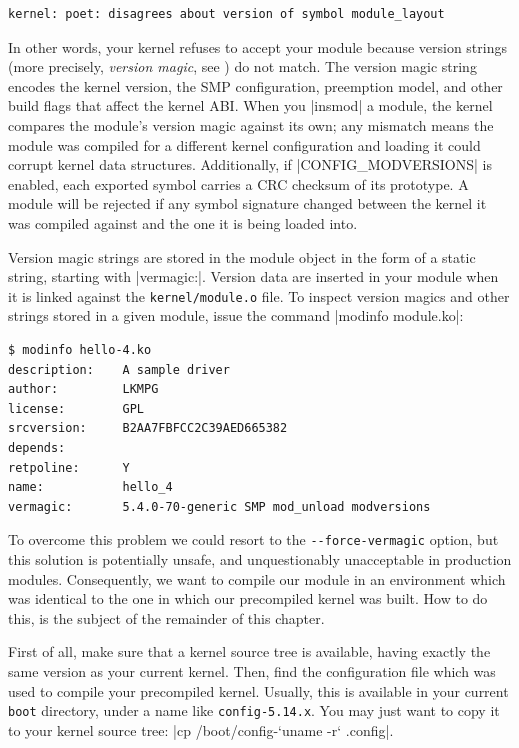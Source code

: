 \documentclass[10pt, oneside]{book}
\begin{document}
\begin{verbatim}
kernel: poet: disagrees about version of symbol module_layout
\end{verbatim}

In other words, your kernel refuses to accept your module because version strings (more precisely, \textit{version magic}, see ) do not match.
The version magic string encodes the kernel version, the SMP configuration, preemption model, and other build flags that affect the kernel ABI.
When you \sh|insmod| a module, the kernel compares the module's version magic against its own; any mismatch means the module was compiled for a different kernel configuration and loading it could corrupt kernel data structures.
Additionally, if \cpp|CONFIG_MODVERSIONS| is enabled, each exported symbol carries a CRC checksum of its prototype. A module will be rejected if any symbol signature changed between the kernel it was compiled against and the one it is being loaded into.

Version magic strings are stored in the module object in the form of a static string, starting with \cpp|vermagic:|.
Version data are inserted in your module when it is linked against the \verb|kernel/module.o| file.
To inspect version magics and other strings stored in a given module, issue the command \sh|modinfo module.ko|:

\begin{verbatim}
$ modinfo hello-4.ko
description:    A sample driver
author:         LKMPG
license:        GPL
srcversion:     B2AA7FBFCC2C39AED665382
depends:
retpoline:      Y
name:           hello_4
vermagic:       5.4.0-70-generic SMP mod_unload modversions
\end{verbatim}

To overcome this problem we could resort to the \verb|--force-vermagic| option, but this solution is potentially unsafe, and unquestionably unacceptable in production modules.
Consequently, we want to compile our module in an environment which was identical to the one in which our precompiled kernel was built.
How to do this, is the subject of the remainder of this chapter.

First of all, make sure that a kernel source tree is available, having exactly the same version as your current kernel.
Then, find the configuration file which was used to compile your precompiled kernel.
Usually, this is available in your current \verb|boot| directory, under a name like \verb|config-5.14.x|.
You may just want to copy it to your kernel source tree: \sh|cp /boot/config-`uname -r` .config|.
\end{document}
